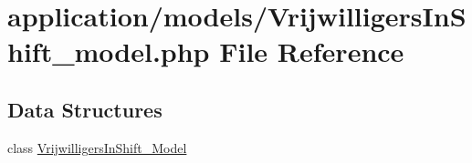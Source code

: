 \hypertarget{_vrijwilligers_in_shift__model_8php}{}\section{application/models/\+Vrijwilligers\+In\+Shift\+\_\+model.php File Reference}
\label{_vrijwilligers_in_shift__model_8php}
\subsection*{Data Structures}
\begin{DoxyCompactItemize}
\item 
class \mbox{\hyperlink{class_vrijwilligers_in_shift___model}{Vrijwilligers\+In\+Shift\+\_\+\+Model}}
\end{DoxyCompactItemize}
